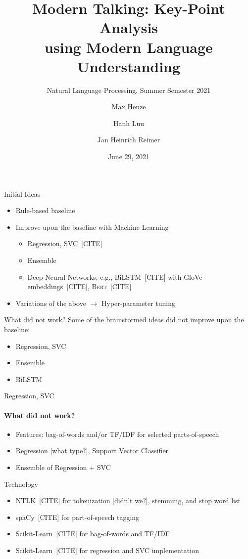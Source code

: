\documentclass[english,handout]{mlutalk}
\title{%
  Modern Talking: Key-Point Analysis \\
  using Modern Language Understanding
}
\subtitle{Natural Language Processing, Summer Semester 2021}
\author{Max Henze \and Hanh Luu \and Jan Heinrich Reimer}
\institute{Martin Luther University Halle-Wittenberg}
\date{June 29, 2021}
\newcommand{\Bert}{\textsc{Bert}\xspace}
\newcommand{\BiLSTM}{\mbox{BiLSTM}\xspace}
\newcommand{\TFIDF}{\mbox{TF/IDF}\xspace}
\newcommand{\todocite}{{\smaller\color{red}[CITE]}\xspace}
\newcommand{\todo}[1]{{\smaller\color{red}[#1]}}
\begin{document}
\titleframe

\begin{frame}{Initial Ideas}
  
  \begin{itemize}
    \item Rule-based baseline
    \item Improve upon the baseline with Machine Learning
    \begin{itemize}
      \item Regression, SVC~\todocite
      \item Ensemble
      \item Deep Neural Networks, e.g., \BiLSTM~\todocite with GloVe embeddings~\todocite, \Bert~\todocite
    \end{itemize}
    \item Variations of the above \(\to\) Hyper-parameter tuning
  \end{itemize}
  
  \begin{block}{What did not work?}
    Some of the brainstormed ideas did not improve upon the baseline:
    \begin{itemize}
      \item Regression, SVC
      \item Ensemble
      \item \BiLSTM
    \end{itemize}
  \end{block}

\end{frame}

\begin{frame}{Regression, SVC}
  
  \framesubtitle{What did not work?}
  
  \begin{itemize}
    \item Features: bag-of-words and/or \TFIDF for selected parts-of-speech
    \item Regression \todo{what type?}, Support Vector Classifier
    \item Ensemble of Regression + SVC
  \end{itemize}
  
  \begin{block}{Technology}
      \begin{itemize}
        \item NTLK~\todocite for tokenization \todo{didn't we?}, stemming,  and stop word list
        \item spaCy~\todocite for part-of-speech tagging
        \item Scikit-Learn~\todocite for bag-of-words and \TFIDF
        \item Scikit-Learn~\todocite for regression and SVC implementation
      \end{itemize}
  \end{block}

\end{frame}
\end{document}
